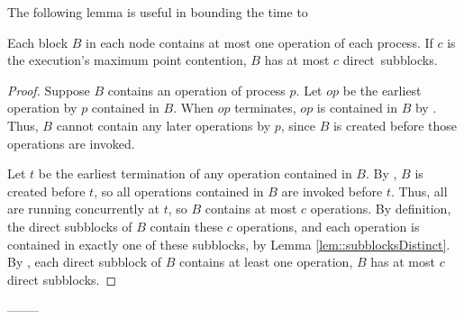 The following lemma is useful in bounding the time to 
\begin{lemma}\label{blockSize}
Each block $B$ in each node contains at most one operation of each process.
If $c$ is the execution's maximum point contention, $B$ has at most $c$ direct~subblocks.
\end{lemma}
\begin{proof}
Suppose $B$ contains an operation of process $p$.
Let $op$ be the earliest operation by $p$ contained in $B$.
When $op$ terminates, $op$ is contained in $B$ by .
Thus, $B$ cannot contain any later operations by $p$, since $B$ is created before
those operations are invoked.

Let $t$ be the earliest termination of any operation contained in $B$.
By , $B$ is created before $t$, so all operations contained in $B$
are invoked before $t$.  Thus, all are  running concurrently at $t$, so $B$ contains at most $c$ operations.
By definition, the direct subblocks of $B$ contain these $c$ operations, and each operation is contained
in exactly one of these subblocks, by Lemma \ref{lem::subblocksDistinct}.
By , each direct subblock of $B$ contains at least one operation,
$B$ has at most $c$ direct subblocks.
\end{proof}

--------

